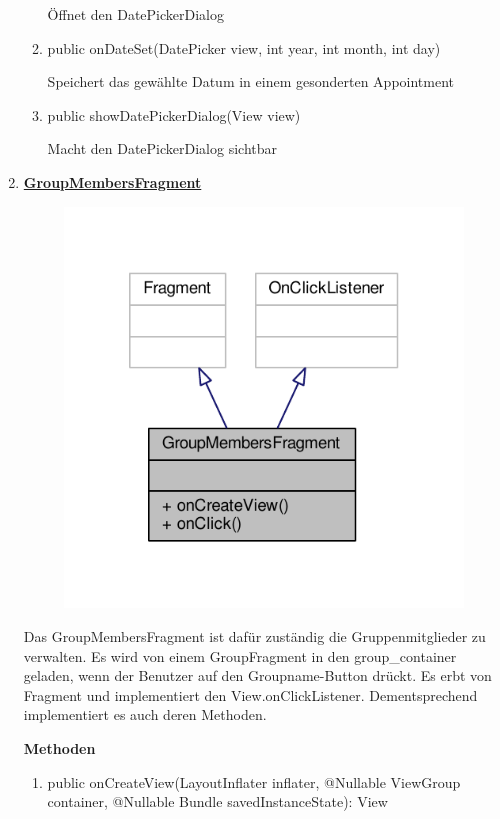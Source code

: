 \begin{enumerate}
\begin{enumerate}
		Öffnet den DatePickerDialog

		\item public onDateSet(DatePicker view, int year, int month, int day)

		Speichert das gewählte Datum in einem gesonderten Appointment

		\item public showDatePickerDialog(View view)

		Macht den DatePickerDialog sichtbar
	
	\end{enumerate}


	\item \textbf{\underline{GroupMembersFragment}}
	
	\begin{figure}[H]
		\includegraphics[scale = 1]{res/group_members_fragment__inherit__graph.pdf}
		\centering
	\end{figure}
	Das GroupMembersFragment ist dafür zuständig die Gruppenmitglieder zu verwalten. Es wird von einem GroupFragment in den group\_container geladen, wenn der Benutzer auf den Groupname-Button drückt. Es erbt von Fragment und implementiert den View.onClickListener. Dementsprechend implementiert es auch deren Methoden.
	
	\textbf{Methoden}
	\begin{enumerate}
		\item public onCreateView(LayoutInflater inflater, @Nullable ViewGroup container, @Nullable Bundle savedInstanceState): View
		

\end{enumerate}
\end{enumerate}
